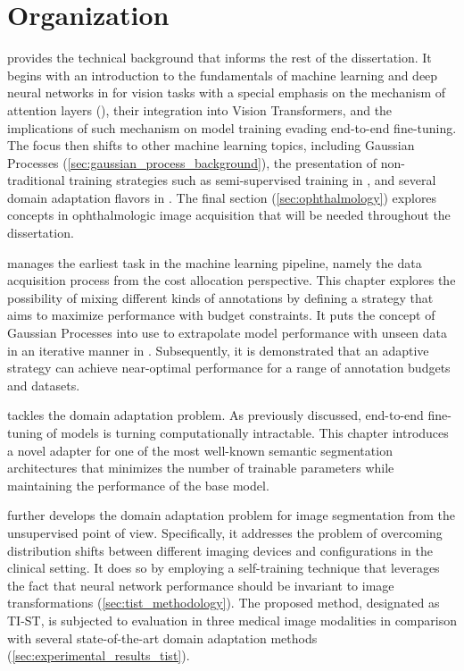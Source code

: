 \section{Organization}
 provides the technical background that informs the rest of the dissertation. It begins with an introduction to the fundamentals of machine learning and deep neural networks in  for vision tasks with a special emphasis on the mechanism of attention layers (), their integration into Vision Transformers, and the implications of such mechanism on model training evading end-to-end fine-tuning. The focus then shifts to other machine learning topics, including Gaussian Processes (\cref{sec:gaussian_process_background}), the presentation of non-traditional training strategies such as semi-supervised training in , and several domain adaptation flavors in . The final section (\cref{sec:ophthalmology}) explores concepts in ophthalmologic image acquisition that will be needed throughout the dissertation.

 manages the earliest task in the machine learning pipeline, namely the data acquisition process from the cost allocation perspective. This chapter explores the possibility of mixing different kinds of annotations by defining a strategy that aims to maximize performance with budget constraints. It puts the concept of Gaussian Processes into use to extrapolate model performance with unseen data in an iterative manner in . Subsequently, it is demonstrated that an adaptive strategy can achieve near-optimal performance for a range of annotation budgets and datasets.

 tackles the domain adaptation problem. As previously discussed, end-to-end fine-tuning of models is turning computationally intractable. This chapter introduces a novel adapter for one of the most well-known semantic segmentation architectures that minimizes the number of trainable parameters while maintaining the performance of the base model. 

 further develops the domain adaptation problem for image segmentation from the unsupervised point of view. Specifically, it addresses the problem of overcoming distribution shifts between different imaging devices and configurations in the clinical setting. It does so by employing a self-training technique that leverages the fact that neural network performance should be invariant to image transformations (\cref{sec:tist_methodology}). The proposed method, designated as TI-ST, is subjected to evaluation in three medical image modalities in comparison with several state-of-the-art domain adaptation methods (\cref{sec:experimental_results_tist}).

